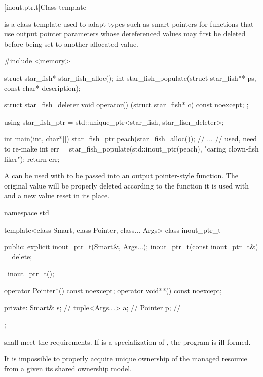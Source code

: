 [inout.ptr.t]{Class template }

\pnum
{} is a class template used to adapt types
such as smart pointers
for functions that use output pointer parameters
whose dereferenced values may first be deleted
before being set to another allocated value.

\pnum
\begin{example}
\begin{codeblock}
#include <memory>

struct star_fish* star_fish_alloc();
int star_fish_populate(struct star_fish** ps, const char* description);

struct star_fish_deleter {
  void operator() (struct star_fish* c) const noexcept;
};

using star_fish_ptr = std::unique_ptr<star_fish, star_fish_deleter>;

int main(int, char*[]) {
  star_fish_ptr peach(star_fish_alloc());
  // ...
  // used, need to re-make
  int err = star_fish_populate(std::inout_ptr(peach), "caring clown-fish liker");
  return err;
}
\end{codeblock}
A  can be used with 
to be passed into an output pointer-style function.
The original value will be properly deleted
according to the function it is used with and
a new value reset in its place.
\end{example}

%
\begin{codeblock}
namespace std {
  template<class Smart, class Pointer, class... Args>
  class inout_ptr_t {
  public:
    explicit inout_ptr_t(Smart&, Args...);
    inout_ptr_t(const inout_ptr_t&) = delete;

    ~inout_ptr_t();

    operator Pointer*() const noexcept;
    operator void**() const noexcept;

  private:
    Smart& s;                   // \expos
    tuple<Args...> a;           // \expos
    Pointer p;                  // \expos
  };
}
\end{codeblock}

\pnum
{} shall meet the  requirements.
If  is a specialization of ,
the program is ill-formed.
\begin{note}
It is impossible to properly acquire unique ownership of the managed resource
from a  given its shared ownership model.
\end{note}

